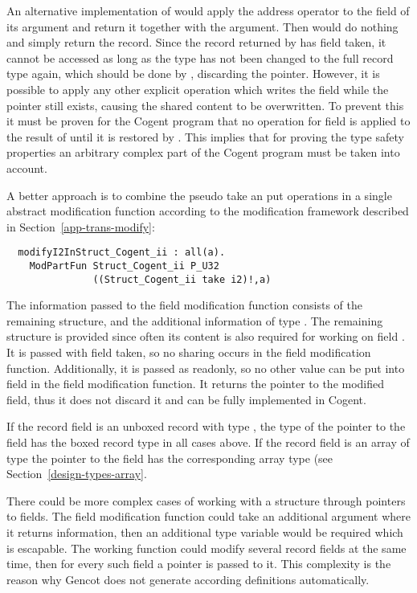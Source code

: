 An alternative implementation of  would apply the address operator to the field  of 
its argument and return it together with the argument. Then  would do nothing and simply 
return the record. Since the record returned by  has field  taken, it
cannot be accessed as long as the type has not been changed to the full record type again, which should be 
done by , discarding the pointer. However, it is possible to apply any other explicit 
operation which writes the field  while the pointer still exists, causing the shared content to
be overwritten. To prevent this it must be proven for the Cogent program that no  operation for field 
 is applied to the result of  until it is restored by . This implies that
for proving the type safety properties an arbitrary complex part of the Cogent program must be taken into
account.

A better approach is to combine the pseudo take an put operations in a single abstract modification function according
to the modification framework described in Section~\ref{app-trans-modify}:
\begin{verbatim}
  modifyI2InStruct_Cogent_ii : all(a). 
    ModPartFun Struct_Cogent_ii P_U32 
               ((Struct_Cogent_ii take i2)!,a)
\end{verbatim}
The information passed to the field modification function consists of the remaining structure, and the additional information
of type . The remaining structure is provided since often its content is also required for working on 
field . It is passed with field  taken, so no sharing occurs in the field modification function. Additionally,
it is passed as readonly, so no other value can be put into field  in the field modification function. It
returns the pointer to the modified field, thus it does not discard it and can be fully implemented in Cogent.

If the record field is an unboxed record with type , the type of the pointer to the field has the boxed record
type  in all cases above. If the record field is an array of type  the pointer to the field
has the corresponding array type  (see Section~\ref{design-types-array}.

There could be more complex cases of working with a structure through pointers to fields. The field modification function could
take an additional argument where it returns information, then an additional type variable  would be required
which is escapable. The working function could modify several record fields at the same time, then for every such field
a pointer is passed to it. This complexity is the reason why Gencot does not generate according definitions automatically.

